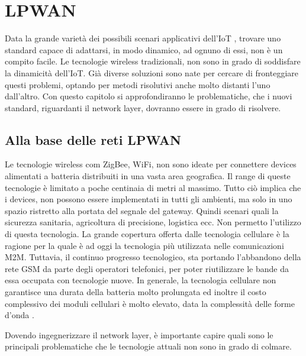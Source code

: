 \chapter{LPWAN}
Data la grande varietà dei possibili scenari applicativi dell'IoT , trovare uno standard
capace di adattarsi, in modo dinamico, ad ognuno di essi, non è un compito
facile. Le tecnologie wireless tradizionali, non sono in grado di soddisfare
la dinamicità  dell'IoT.
Già diverse soluzioni sono nate per cercare di fronteggiare questi
problemi, optando per metodi risolutivi  anche molto distanti l'uno dall'altro.
Con questo capitolo si approfondiranno le problematiche, che i nuovi standard, riguardanti il
network layer, dovranno essere in grado di risolvere.
\section{Alla base delle reti LPWAN}  
Le tecnologie wireless com ZigBee, WiFi, non sono ideate per connettere devices
alimentati a batteria distribuiti in una vasta area geografica.
Il range di queste tecnologie è limitato a poche centinaia di metri al massimo.
Tutto ciò implica che i devices, non possono essere implementati in tutti gli
ambienti, ma solo in uno spazio ristretto alla portata del segnale del gateway.
Quindi scenari quali la sicurezza sanitaria, agricoltura di precisione, logistica ecc. Non
permetto l'utilizzo di questa tecnologia.
La grande copertura offerta dalle tecnologia cellulare è la ragione per la quale
è ad oggi la tecnologia più utilizzata nelle comunicazioni M2M.
Tuttavia, il continuo progresso tecnologico, sta portando l'abbandono della rete
GSM da parte degli operatori telefonici, per poter riutilizzare le bande da essa
occupata con tecnologie nuove. In generale, la tecnologia cellulare non
garantisce una durata della batteria molto prolungata ed inoltre il costo
complessivo dei moduli cellulari è molto elevato, data la complessità delle 
forme d'onda .%

Dovendo ingegnerizzare il network layer, è importante capire quali sono le
principali problematiche che le tecnologie attuali non sono in grado di colmare.


